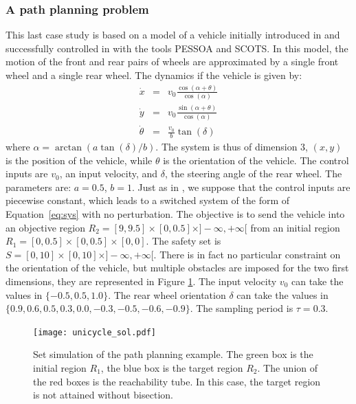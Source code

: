 \subsubsection{A path planning problem}


This last case study is based on a model of a vehicle initially
introduced in \cite{astrom2010feedback} and successfully controlled in
\cite{zamani2012symbolic,reissig2015feedback} with the tools PESSOA
and SCOTS. In this model, the motion of the front and rear pairs of
wheels are approximated by a single front wheel and a single rear
wheel. The dynamics if the vehicle is given by:
\begin{equation}
 \begin{array}{ccc}
  \dot x & = & v_0 \frac{\cos(\alpha + \theta)}{\cos(\alpha)} \\
  \dot y & = & v_0 \frac{\sin(\alpha + \theta)}{\cos(\alpha)} \\
  \dot \theta & = & \frac{v_0}{b} \tan(\delta)
  \end{array}
\end{equation}
where $\alpha = \arctan( a \tan (\delta) / b)$. The system is thus of
dimension $3$, $(x,y)$ is the position of the vehicle, while $\theta$
is the orientation of the vehicle.  The control inputs are $v_0$, an
input velocity, and $\delta$, the steering angle of the rear wheel.
The parameters are: $a=0.5$, $b=1$.  Just as in
\cite{zamani2012symbolic,reissig2015feedback}, we suppose that the
control inputs are piecewise constant, which leads to a switched
system of the form of Equation~\eqref{eq:sys} with no perturbation.
The objective is to send the vehicle into an objective region $R_2 =
[9,9.5]\times[0,0.5]\times ]-\infty,+\infty[$ from an initial region
$R_1 = [0,0.5]\times[0,0.5]\times[0,0]$. The safety set is $S = [0,10]
\times [0,10] \times]-\infty,+\infty[$.  There is in fact no
particular constraint on the orientation of the vehicle, but multiple
obstacles are imposed for the two first dimensions, they are
represented in Figure \ref{fig:unicycle}. The input velocity $v_0$ can
take the values in $\{-0.5,0.5,1.0\}$. The rear wheel orientation
$\delta$ can take the values in
$\{0.9,0.6,0.5,0.3,0.0,-0.3,-0.5,-0.6,-0.9\}$. The sampling period is
$\tau = 0.3$.

\begin{figure}[t]
  \centering
  \texttt{[image: unicycle\_sol.pdf]}
  \caption{Set simulation of the path planning example. The green box
    is the initial region $R_1$, the blue box is the target region
    $R_2$. The union of the red boxes is the reachability tube. In
    this case, the target region is not attained without bisection.}
  \label{fig:unicycle}
\end{figure}


